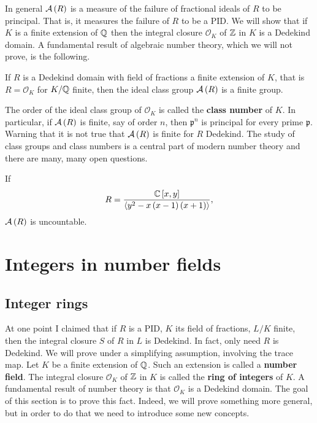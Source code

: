 In general $ \mathcal{A}\left( R \right) $ is a measure of the failure of fractional ideals of $ R $ to be principal. That is, it measures the failure of $ R $ to be a PID. We will show that if $ K $ is a finite extension of $ \mathbb{Q} $ then the integral closure $ \mathcal{O}_K $ of $ \mathbb{Z} $ in $ K $ is a Dedekind domain. A fundamental result of algebraic number theory, which we will not prove, is the following.

\begin{theorem}
If $ R $ is a Dedekind domain with field of fractions a finite extension of $ K $, that is $ R = \mathcal{O}_K $ for $ K / \mathbb{Q} $ finite, then the ideal class group $ \mathcal{A}\left( R \right) $ is a finite group.
\end{theorem}

The order of the ideal class group of $ \mathcal{O}_K $ is called the \textbf{class number} of $ K $. In particular, if $ \mathcal{A}\left( R \right) $ is finite, say of order $ n $, then $ \mathfrak{p}^n $ is principal for every prime $ \mathfrak{p} $. Warning that it is not true that $ \mathcal{A}\left( R \right) $ is finite for $ R $ Dedekind. The study of class groups and class numbers is a central part of modern number theory and there are many, many open questions.

\begin{example2}
If
$$ R = \dfrac{\mathbb{C}\left[ x, y \right]}{\left\langle y^2 - x\left( x - 1 \right)\left( x + 1 \right) \right\rangle}, $$
$ \mathcal{A}\left( R \right) $ is uncountable.
\end{example2}

\pagebreak

\section{Integers in number fields}

\subsection{Integer rings}

At one point I claimed that if $ R $ is a PID, $ K $ its field of fractions, $ L / K $ finite, then the integral closure $ S $ of $ R $ in $ L $ is Dedekind. In fact, only need $ R $ is Dedekind. We will prove under a simplifying assumption, involving the trace map. Let $ K $ be a finite extension of $ \mathbb{Q} $. Such an extension is called a \textbf{number field}. The integral closure $ \mathcal{O}_K $ of $ \mathbb{Z} $ in $ K $ is called the \textbf{ring of integers} of $ K $. A fundamental result of number theory is that $ \mathcal{O}_K $ is a Dedekind domain. The goal of this section is to prove this fact. Indeed, we will prove something more general, but in order to do that we need to introduce some new concepts.

